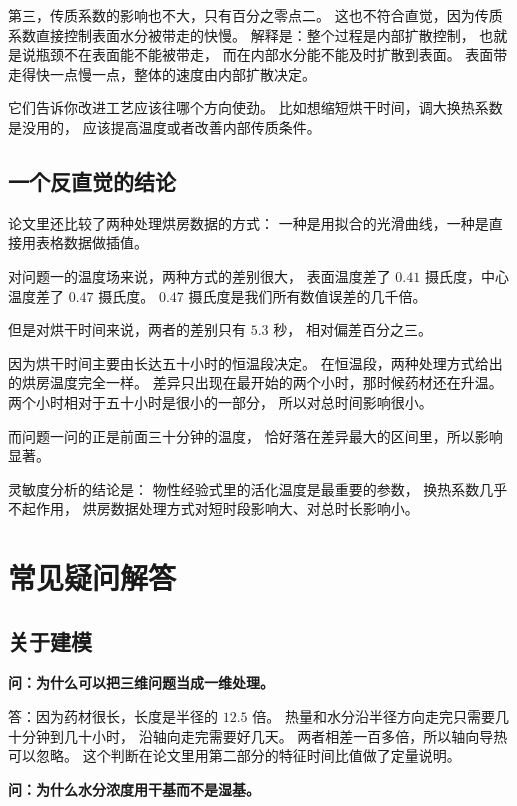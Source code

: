第三，传质系数的影响也不大，只有百分之零点二。
这也不符合直觉，因为传质系数直接控制表面水分被带走的快慢。
解释是：整个过程是内部扩散控制，
也就是说瓶颈不在表面能不能被带走，
而在内部水分能不能及时扩散到表面。
表面带走得快一点慢一点，整体的速度由内部扩散决定。

它们告诉你改进工艺应该往哪个方向使劲。
比如想缩短烘干时间，调大换热系数是没用的，
应该提高温度或者改善内部传质条件。

\subsection{一个反直觉的结论}

论文里还比较了两种处理烘房数据的方式：
一种是用拟合的光滑曲线，一种是直接用表格数据做插值。

对问题一的温度场来说，两种方式的差别很大，
表面温度差了 $0.41$ 摄氏度，中心温度差了 $0.47$ 摄氏度。
$0.47$ 摄氏度是我们所有数值误差的几千倍。

但是对烘干时间来说，两者的差别只有 $5.3$ 秒，
相对偏差百分之三。

因为烘干时间主要由长达五十小时的恒温段决定。
在恒温段，两种处理方式给出的烘房温度完全一样。
差异只出现在最开始的两个小时，那时候药材还在升温。
两个小时相对于五十小时是很小的一部分，
所以对总时间影响很小。

而问题一问的正是前面三十分钟的温度，
恰好落在差异最大的区间里，所以影响显著。

\keypoint
灵敏度分析的结论是：
物性经验式里的活化温度是最重要的参数，
换热系数几乎不起作用，
烘房数据处理方式对短时段影响大、对总时长影响小。

\section{常见疑问解答}

\subsection{关于建模}

\textbf{问：为什么可以把三维问题当成一维处理。}

答：因为药材很长，长度是半径的 $12.5$ 倍。
热量和水分沿半径方向走完只需要几十分钟到几十小时，
沿轴向走完需要好几天。
两者相差一百多倍，所以轴向导热可以忽略。
这个判断在论文里用第二部分的特征时间比值做了定量说明。

\textbf{问：为什么水分浓度用干基而不是湿基。}

